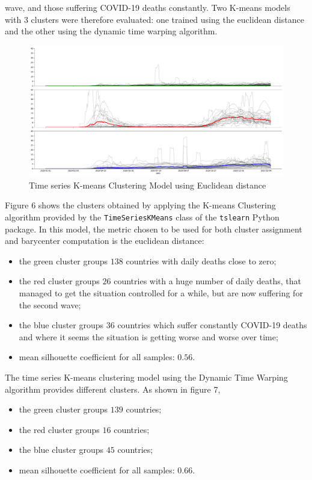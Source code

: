 \documentclass[11pt,a4paper]{article}
\begin{document}
wave, and those suffering COVID-19 deaths constantly. Two K-means models with
3 clusters were therefore evaluated: one trained using the euclidean distance
and the other using the dynamic time warping algorithm.
\begin{figure}[H]
    \begin{center}
        \includegraphics[scale=0.32]{img/daily-deaths-euclidean-clusters.pdf}
    \end{center}
    \vspace{-0.2cm}
    \caption{Time series K-means Clustering Model using Euclidean distance}
\end{figure}
\noindent
Figure 6 shows the clusters obtained by applying the K-means Clustering
algorithm provided by the \texttt{TimeSeriesKMeans} class of the
\texttt{tslearn} Python package. In this model, the metric chosen to be used for
both cluster assignment and barycenter computation is the euclidean distance:
\begin{itemize}
    \item the {\color{ForestGreen}green cluster} groups $138$ countries with
    daily deaths close to zero;
    \item the {\color{red}red cluster} groups $26$ countries with a huge number
    of daily deaths, that managed to get the situation controlled for a while,
    but are now suffering for the second wave;
    \item the {\color{blue}blue cluster} groups $36$ countries which suffer
    constantly COVID-19 deaths and where it seems the situation is getting worse
    and worse over time;
    \item mean silhouette coefficient for all samples: $0.56$.
\end{itemize}
The time series K-means clustering model using the Dynamic Time Warping
algorithm provides different clusters. As shown in figure 7,
\begin{itemize}
    \item the {\color{ForestGreen}green cluster} groups $139$ countries;
    \item the {\color{red}red cluster} groups $16$ countries;
    \item the {\color{blue}blue cluster} groups $45$ countries;
    \item mean silhouette coefficient for all samples: $0.66$.
\end{itemize}
\end{document}
